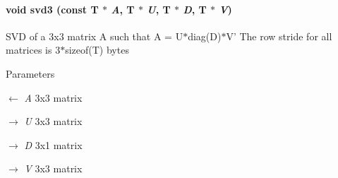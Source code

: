 \hypertarget{namespaceOpenRAVE_1_1mathextra_a698af188ade25c457317354c0e9ebcba}{
\paragraph[{svd3}]{\setlength{\rightskip}{0pt plus 5cm}void svd3 (const T $\ast$ {\em A}, \/  T $\ast$ {\em U}, \/  T $\ast$ {\em D}, \/  T $\ast$ {\em V})}\hfill}
\label{namespaceOpenRAVE_1_1mathextra_a698af188ade25c457317354c0e9ebcba}
SVD of a 3x3 matrix A such that A = U$\ast$diag(D)$\ast$V' The row stride for all matrices is 3$\ast$sizeof(T) bytes 
\begin{DoxyParams}{Parameters}
\item[\mbox{$\leftarrow$} {\em A}]3x3 matrix \item[\mbox{$\rightarrow$} {\em U}]3x3 matrix \item[\mbox{$\rightarrow$} {\em D}]3x1 matrix \item[\mbox{$\rightarrow$} {\em V}]3x3 matrix \end{DoxyParams}
